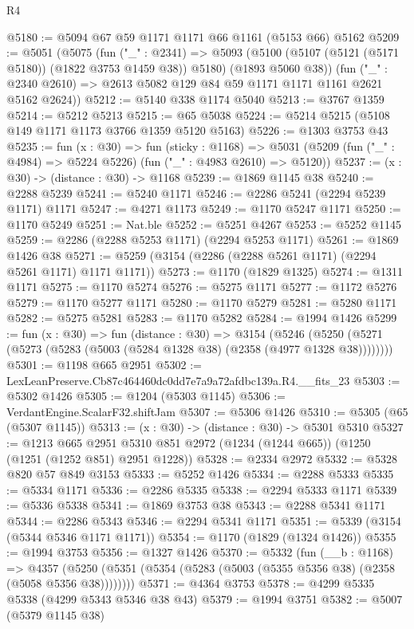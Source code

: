 \begin{lexlean}{R4}
\begin{coremodule}
@5180 := @5094 @67 @59 @1171 @1171 @66 @1161 (@5153 @66) @5162
@5209 := @5051
    (@5075
      (fun ("_" : @2341) =>
      @5093 (@5100 (@5107 (@5121 (@5171 @5180)) (@1822 @3753 @1459 @38)) @5180) (@1893 @5060 @38))
      (fun ("_" : @2340 @2610) => @2613 @5082 @129 @84 @59 @1171 @1171 @1161 @2621 @5162 @2624))
@5212 := @5140 @338 @1174 @5040
@5213 := @3767 @1359
@5214 := @5212 @5213
@5215 := @65 @5038
@5224 := @5214 @5215 (@5108 @149 @1171 @1173 @3766 @1359 @5120 @5163)
@5226 := @1303 @3753 @43
@5235 := fun (x : @30) =>
  fun (sticky : @1168) =>
  @5031 (@5209 (fun ("_" : @4984) => @5224 @5226) (fun ("_" : @4983 @2610) => @5120))
@5237 := (x : @30) -> (distance : @30) -> @1168
@5239 := @1869 @1145 @38
@5240 := @2288 @5239
@5241 := @5240 @1171
@5246 := @2286 @5241 (@2294 @5239 @1171) @1171
@5247 := @4271 @1173
@5249 := @1170 @5247 @1171
@5250 := @1170 @5249
@5251 := Nat.ble
@5252 := @5251 @4267
@5253 := @5252 @1145
@5259 := @2286 (@2288 @5253 @1171) (@2294 @5253 @1171)
@5261 := @1869 @1426 @38
@5271 := @5259 (@3154 (@2286 (@2288 @5261 @1171) (@2294 @5261 @1171) @1171 @1171))
@5273 := @1170 (@1829 @1325)
@5274 := @1311 @1171
@5275 := @1170 @5274
@5276 := @5275 @1171
@5277 := @1172 @5276
@5279 := @1170 @5277 @1171
@5280 := @1170 @5279
@5281 := @5280 @1171
@5282 := @5275 @5281
@5283 := @1170 @5282
@5284 := @1994 @1426
@5299 := fun (x : @30) =>
  fun (distance : @30) =>
  @3154 (@5246 (@5250 (@5271 (@5273 (@5283 (@5003 (@5284 @1328 @38) (@2358 (@4977 @1328 @38))))))))
@5301 := @1198 @665 @2951
@5302 := LexLeanPreserve.Cb87c464460dc0dd7e7a9a72afdbc139a.R4.__fits_23
@5303 := @5302 @1426
@5305 := @1204 (@5303 @1145)
@5306 := VerdantEngine.ScalarF32.shiftJam
@5307 := @5306 @1426
@5310 := @5305 (@65 (@5307 @1145))
@5313 := (x : @30) -> (distance : @30) -> @5301 @5310
@5327 := @1213
    @665
    @2951
    @5310
    @851
    @2972
    (@1234 (@1244 @665))
    (@1250 (@1251 (@1252 @851) @2951 @1228))
@5328 := @2334 @2972
@5332 := @5328 @820 @57 @849 @3153
@5333 := @5252 @1426
@5334 := @2288 @5333
@5335 := @5334 @1171
@5336 := @2286 @5335
@5338 := @2294 @5333 @1171
@5339 := @5336 @5338
@5341 := @1869 @3753 @38
@5343 := @2288 @5341 @1171
@5344 := @2286 @5343
@5346 := @2294 @5341 @1171
@5351 := @5339 (@3154 (@5344 @5346 @1171 @1171))
@5354 := @1170 (@1829 (@1324 @1426))
@5355 := @1994 @3753
@5356 := @1327 @1426
@5370 := @5332
    (fun (__b : @1168) =>
    @4357 (@5250 (@5351 (@5354 (@5283 (@5003 (@5355 @5356 @38) (@2358 (@5058 @5356 @38))))))))
@5371 := @4364 @3753
@5378 := @4299 @5335 @5338 (@4299 @5343 @5346 @38 @43)
@5379 := @1994 @3751
@5382 := @5007 (@5379 @1145 @38)

\end{coremodule}
\end{lexlean}
